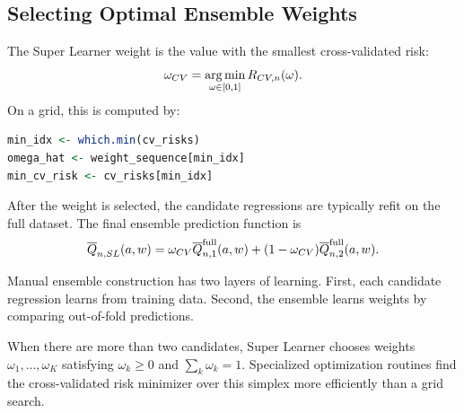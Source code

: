 \subsection{Selecting Optimal Ensemble Weights}

The Super Learner weight is the value with the smallest cross-validated risk:
\[
\omega_{CV}=\operatorname*{arg\,min}_{\omega\in[0,1]}R_{CV,n}(\omega).
\]
On a grid, this is computed by:

\begin{implementationbox}
\begin{lstlisting}[language=R]
min_idx <- which.min(cv_risks)
omega_hat <- weight_sequence[min_idx]
min_cv_risk <- cv_risks[min_idx]
\end{lstlisting}
\end{implementationbox}

After the weight is selected, the candidate regressions are typically refit on the full
dataset. The final ensemble prediction function is
\[
\overline{Q}_{n,SL}(a,w)
=
\omega_{CV}\overline{Q}_{n,1}^{\mathrm{full}}(a,w)
+
(1-\omega_{CV})\overline{Q}_{n,2}^{\mathrm{full}}(a,w).
\]

\begin{keyidea}
Manual ensemble construction has two layers of learning. First, each candidate
regression learns from training data. Second, the ensemble learns weights by comparing
out-of-fold predictions.
\end{keyidea}

\begin{estimationbox}
When there are more than two candidates, Super Learner chooses weights
$\omega_1,\ldots,\omega_K$ satisfying $\omega_k\ge 0$ and $\sum_k\omega_k=1$.
Specialized optimization routines find the cross-validated risk minimizer over this
simplex more efficiently than a grid search.
\end{estimationbox}
